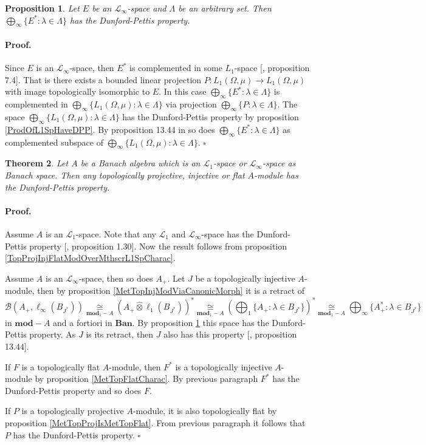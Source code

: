 \documentclass[12pt]{article}
\newcommand{\projtens}{\mathbin{\widehat{\otimes}}}
\newcommand{\isom}[1]{\mathop{\mathbin{\cong}}\limits_{#1}}
\newtheorem{theorem}{Theorem}[section]
\newtheorem{proposition}[theorem]{Proposition}
\renewenvironment{proof}{\paragraph{Proof.}}{\hfill$\square$\medskip}
\begin{document}
\begin{proposition}\label{ProdOfDualsOfMthscrLInftySpHaveDPP} Let $E$ be an $\mathscr{L}_\infty$-space and $\Lambda$ be an arbitrary set. Then $\bigoplus_\infty\{E^*:\lambda\in\Lambda\}$ has the Dunford-Pettis property.
\end{proposition}
\begin{proof} Since $E$ is an $\mathscr{L}_\infty$-space, then $E^*$ is complemented in some $L_1$-space [\cite{LinPelAbsSumOpInLpSpAndApp}, proposition 7.4]. That is there exists a bounded linear projection $P:L_1(\Omega,\mu)\to L_1(\Omega,\mu)$ with image topologically isomorphic to $E$. In this case $\bigoplus_\infty\{ E^*:\lambda\in\Lambda\}$ is complemented in $\bigoplus_\infty\{ L_1(\Omega,\mu):\lambda\in\Lambda\}$ via projection $\bigoplus_\infty\{P:\lambda\in\Lambda\}$. The space $\bigoplus_\infty\{ L_1(\Omega,\mu):\lambda\in\Lambda\}$ has the Dunford-Pettis property by proposition \ref{ProdOfL1SpHaveDPP}. By proposition 13.44 in \cite{FabHabBanSpTh} so does $\bigoplus_\infty\{ E^*:\lambda\in\Lambda\}$ as complemented subspace of $\bigoplus_\infty\{ L_1(\Omega,\mu):\lambda\in\Lambda\}$.
\end{proof}

\begin{theorem}\label{TopProjInjFlatModOverMthscrL1OrLInftySpHaveDPP} Let $A$ be a Banach algebra which is an $\mathscr{L}_1$-space or $\mathscr{L}_\infty$-space as Banach space. Then any topologically projective, injective or flat $A$-module has the Dunford-Pettis property.
\end{theorem}
\begin{proof} Assume $A$ is an $\mathscr{L}_1$-space. Note that any $\mathscr{L}_1$ and $\mathscr{L}_\infty$-space has the Dunford-Pettis property [\cite{BourgNewClOfLpSp}, proposition 1.30]. Now the result follows from proposition \ref{TopProjInjFlatModOverMthscrL1SpCharac}.

Assume $A$ is an $\mathscr{L}_\infty$-space, then so does $A_+$. Let $J$ be a topologically injective $A$-module, then by proposition \ref{MetTopInjModViaCanonicMorph} it is a retract of 
$$
\mathcal{B}(A_+,\ell_\infty(B_{J^*}))\isom{\mathbf{mod}_1-A}(A_+\projtens\ell_1(B_{J^*}))^*\isom{\mathbf{mod}_1-A}
\left(\bigoplus\nolimits_1\{ A_+:\lambda\in B_{J^*}\}\right)^*\isom{\mathbf{mod}_1-A}
\bigoplus\nolimits_\infty\{ A_+^*:\lambda\in B_{J^*}\}
$$ 
in $\mathbf{mod}-A$ and a fortiori in $\mathbf{Ban}$. By proposition \ref{ProdOfDualsOfMthscrLInftySpHaveDPP} this space has the Dunford-Pettis property. As $J$ is its retract, then $J$ also has this property [\cite{FabHabBanSpTh}, proposition 13.44]. 

If $F$ is a topologically flat $A$-module, then $F^*$ is a topologically injective $A$-module by proposition \ref{MetTopFlatCharac}. By previous paragraph $F^*$ has the Dunford-Pettis property and so does $F$.

If $P$ is a topologically projective $A$-module, it is also topologically flat by proposition \ref{MetTopProjIsMetTopFlat}. From previous paragraph it follows that $P$ has the Dunford-Pettis property.
\end{proof}
\end{document}
